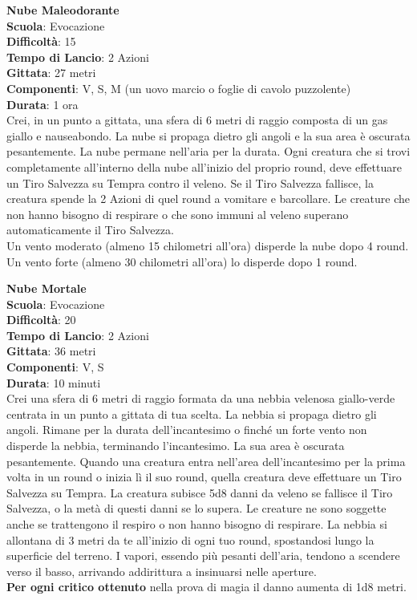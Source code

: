 \begin{multicols}{2}
\medskip\textbf{Nube Maleodorante}\\
\textbf{Scuola}: Evocazione\\
\textbf{Difficoltà}:  15\\
\textbf{Tempo di Lancio}: 2 Azioni\\
\textbf{Gittata}: 27 metri\\
\textbf{Componenti}: V, S, M (un uovo marcio o foglie di cavolo puzzolente)\\
\textbf{Durata}: 1 ora\\
Crei, in un punto a gittata, una sfera di 6 metri di raggio composta di un gas giallo e nauseabondo. La nube si propaga dietro gli angoli e la sua area è oscurata pesantemente. La nube permane nell'aria per la durata. Ogni creatura che si trovi completamente all'interno della nube all'inizio del proprio round, deve effettuare un Tiro Salvezza su Tempra contro il veleno. Se il Tiro Salvezza fallisce, la creatura spende la 2 Azioni di quel round a vomitare e barcollare. Le creature che non hanno bisogno di respirare o che sono immuni al veleno superano automaticamente il Tiro Salvezza.\\
Un vento moderato (almeno 15 chilometri all'ora) disperde la nube dopo 4 round. Un vento forte (almeno 30 chilometri all'ora) lo disperde dopo 1 round.

\medskip\textbf{Nube Mortale}\\
\textbf{Scuola}: Evocazione\\
\textbf{Difficoltà}:  20\\
\textbf{Tempo di Lancio}: 2 Azioni\\
\textbf{Gittata}: 36 metri\\
\textbf{Componenti}: V, S\\
\textbf{Durata}: 10 minuti \\
Crei una sfera di 6 metri di raggio formata da una  nebbia velenosa giallo-verde centrata in un punto a gittata di tua scelta. La nebbia si propaga dietro gli angoli. Rimane per la durata dell'incantesimo o finché un forte vento non disperde la nebbia, terminando l'incantesimo. La sua area è oscurata pesantemente. Quando una creatura entra nell'area dell'incantesimo per la prima volta in un round o inizia lì il suo round, quella creatura deve effettuare un Tiro Salvezza su Tempra. La creatura subisce 5d8 danni da veleno se fallisce il Tiro Salvezza, o la metà di questi danni se lo supera. Le creature ne sono soggette anche se trattengono il respiro o non hanno bisogno di respirare. La nebbia si allontana di 3 metri da te all'inizio di ogni tuo round, spostandosi lungo la superficie del terreno. I vapori, essendo più pesanti dell'aria, tendono a
scendere verso il basso, arrivando addirittura a insinuarsi nelle aperture.\\
\textbf{Per ogni critico ottenuto} nella prova di magia il danno aumenta di 1d8 metri.


\end{multicols}
